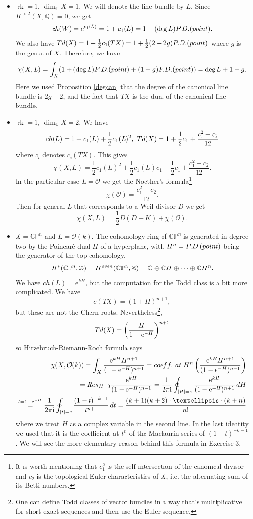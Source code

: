 \documentclass[11pt]{article}
\numberwithin{equation}{section}
\numberwithin{footnote}{section}
\newcommand{\blue}{\color{blue}}
\newcommand{\ee}{{\mathrm e}}
\newcommand{\ii}{{\mathrm i}}
\renewcommand{\P}{{\mathbb P}}
\newcommand{\Q}{{\mathbb Q}}
\newcommand{\Z}{{\mathbb Z}}
\newcommand{\C}{{\mathbb C}}
\DeclareMathOperator{\rk}{rk}
\begin{document}
\begin{itemize}
\item $\rk  =1$, $\dim_\C X = 1$. We will denote the line bundle by $L$.
Since $H^{>2}(X,\Q)=0$, we get
$$ch(W) = \ee^{c_1(L)} = 1+ c_1(L) = 1+ (\deg L ){\rm P.D.(point)}.$$
We also have
${\rm Td}(X)=1+\frac12 c_1(TX) = 1 + \frac 12 (2-2g) {\rm P.D.(point)}$ where $g$ is the genus of $X$. Therefore,
we have 
$$
\chi(X,L) = \int_X (1+ (\deg L ){\rm P.D.(point)}  +(1-g) {\rm P.D.(point)})= \deg L + 1-g.
$$
Here we used Proposition \ref{degcan} that the degree of the canonical line bundle is $2g-2$, and the fact that $TX$ is the dual of the canonical line bundle.

\item $\rk =1$, $\dim_\C X = 2$. We have 
$$
ch(L) = 1+ c_1(L) + \frac 12 c_1(L)^2,~ {\rm Td}(X) = 1+\frac 12 c_1 + \frac {c_1^2 + c_2}{12}
$$
where $c_i$ denotes $c_i(TX)$. This gives
$$
\chi(X,L) = \frac 12 c_1(L)^2 + \frac 12 c_1(L) c_1 + \frac 12 c_1 + \frac {c_1^2 + c_2}{12}.
$$
In the particular case $L=\mathcal O$ we get the {\blue Noether's formula}\footnote{ It is worth mentioning that $c_1^2$ is the self-intersection of the canonical divisor and $c_2$ is the topological Euler characteristics of $X$, i.e. the alternating sum of its Betti numbers.}
$$
\chi(\mathcal O) =  \frac {c_1^2 + c_2}{12}.
$$
Then for general $L$ that corresponds to a Weil divisor $D$ we get
$$
\chi(X,L) = \frac 12  D(D-K)+\chi(\mathcal O).
$$

\item
$X=\C\P^n$ and $L = \mathcal O(k)$. The cohomology ring of $\C\P^n$ is generated in degree two by the Poincar\'e dual $H$ of a hyperplane, with $H^n={\rm P.D.(point)}$ being the generator of the top cohomology.
$$
H^{*}(\C\P^n,\Z) = H^{\rm even}(\C\P^n,\Z) = \C\oplus \C H\oplus \cdots \oplus\C H^n.
$$
We have $ch(L) = \ee^{kH}$, but the computation for the Todd class is a bit more complicated. We have
$$
c(TX) = (1+H)^{n+1},
$$
but these are not the Chern roots. Nevertheless\footnote{ One can define Todd classes of vector bundles in a way that's multiplicative for short exact sequences and then use the Euler sequence.},
$$
{\rm Td}(X) = \left(\frac {H}{1- \ee^{-H}} \right)^{n+1}
$$
so Hirzebruch-Riemann-Roch formula says
\begin{align*}
\chi(X,\mathcal O(k)) = \int_X \frac {\ee^{kH} H^{n+1}}{(1- \ee^{-H})^{n+1}}
={\rm coeff.~at~}H^n\left( \frac {\ee^{kH} H^{n+1}}{(1- \ee^{-H})^{n+1}}\right)\\
={\rm Res}_{H=0}\frac {\ee^{kH} }{(1- \ee^{-H})^{n+1}} 
=\frac 1{2\pi\ii} \oint_{|H|=\varepsilon}\frac {\ee^{kH} }{(1- \ee^{-H})^{n+1}} \,dH 
\\
\stackrel {t=1-\ee^{-H}}{=}
\frac 1{2\pi\ii} \oint_{|t|
=\varepsilon}\frac {(1-t)^{-k-1} }{t^{n+1}}  \, dt = 
\frac {(k+1)(k+2)\cdot\ldots\cdot(k+n)}{n!}
\end{align*}
where we treat $H$ as a complex variable in the second line. In the last identity we used that it is the coefficient at $t^n$ of the Maclaurin series of $(1-t)^{-k-1}$.
We will see the more elementary reason behind this formula in Exercise 3.
\end{itemize}
\end{document}
